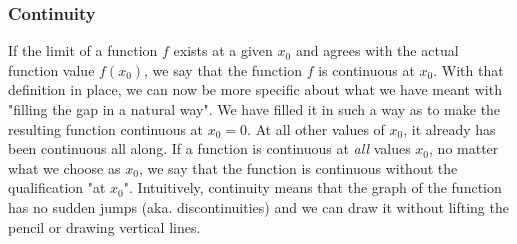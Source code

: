 \subsubsection{Continuity}
If the limit of a function $f$ exists at a given $x_0$ and agrees with the actual function value $f(x_0)$, we say that the function $f$ is continuous at $x_0$. With that definition in place, we can now be more specific about what we have meant with "filling the gap in a natural way". We have filled it in such a way as to make the resulting function continuous at $x_0 = 0$. At all other values of $x_0$, it already has been continuous all along. If a function is continuous at \emph{all} values $x_0$, no matter what we choose as $x_0$, we say that the function is continuous without the qualification "at $x_0$". Intuitively, continuity means that the graph of the function has no sudden jumps (aka. discontinuities) and we can draw it without lifting the pencil or drawing vertical lines.




